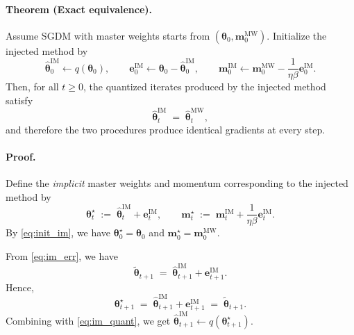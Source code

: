 \documentclass[11pt, a4paper, onecolumn, copyright, goog]{google}
\newcommand{\vect}[1]{\mathbf{#1}}
\newcommand{\vtheta}{\boldsymbol{\theta}}
\newcommand{\vm}{\vect{m}}
\newcommand{\ve}{\vect{e}}
\newcommand{\qfn}{\textit{q}}
\theoremstyle{plain}
\theoremstyle{definition}
\theoremstyle{remark}
\begin{document}
\paragraph{Theorem (Exact equivalence).}
Assume SGDM with master weights starts from $(\vtheta_0,\vm^{\text{MW}}_0)$. Initialize the injected method by
\begin{equation}
\hat{\vtheta}^{\text{IM}}_0 \leftarrow \qfn(\vtheta_0), 
\qquad
\ve^{\text{IM}}_{0} \leftarrow \vtheta_0 - \hat{\vtheta}^{\text{IM}}_0,
\qquad
\vm^{\text{IM}}_0 \leftarrow \vm^{\text{MW}}_0 - \frac{1}{\eta\beta}\ve^{\text{IM}}_{0}.
\label{eq:init_im}
\end{equation}
Then, for all $t\ge 0$, the quantized iterates produced by the injected method satisfy
\[
\hat{\vtheta}^{\text{IM}}_t \;=\; \hat{\vtheta}^{\text{MW}}_t,
\]
and therefore the two procedures produce identical gradients at every step.

\paragraph{Proof.}
Define the \emph{implicit} master weights and momentum corresponding to the injected method by
\begin{equation}
\vtheta^{\star}_t \;:=\; \hat{\vtheta}^{\text{IM}}_t + \ve^{\text{IM}}_{t},
\qquad
\vm^{\star}_t \;:=\; \vm^{\text{IM}}_t + \frac{1}{\eta\beta}\ve^{\text{IM}}_{t}.
\label{eq:implicit_defs}
\end{equation}
By \eqref{eq:init_im}, we have $\vtheta^{\star}_0=\vtheta_0$ and $\vm^{\star}_0=\vm^{\text{MW}}_0$.

From \eqref{eq:im_err}, we have
\begin{equation}
\tilde{\vtheta}_{t+1} \;=\; \hat{\vtheta}^{\text{IM}}_{t+1} + \ve^{\text{IM}}_{t+1}.
\label{eq:tilde_decomp}
\end{equation}
Hence,
\begin{equation}
\vtheta^{\star}_{t+1}
\;=\;
\hat{\vtheta}^{\text{IM}}_{t+1} + \ve^{\text{IM}}_{t+1}
\;=\;
\tilde{\vtheta}_{t+1}.
\label{eq:theta_star_is_tilde}
\end{equation}
Combining with \eqref{eq:im_quant}, we get
$\hat{\vtheta}^{\text{IM}}_{t+1} \leftarrow \qfn(\vtheta^\star_{t+1})$.
\end{document}
